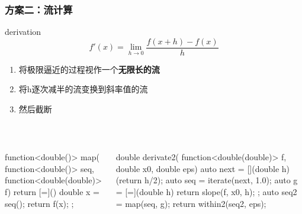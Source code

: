 \documentclass[UTF8,lualatex]{ctexbeamer}
\renewcommand{\emph}[1]{\textbf{#1}}
\begin{document}
\begin{frame}[fragile,t]
    \frametitle{方案二：流计算}
    \footnotesize
    \begin{block}{derivation}
        \[
            f'(x) = \lim_{h\to 0}\frac{f(x+h) - f(x)}{h}
        \]
        \begin{enumerate}
            \item 将极限逼近的过程视作一个\emph{无限长的流}
            \item 将h逐次减半的流变换到斜率值的流
            \item 然后截断
        \end{enumerate}
    \end{block}
    \vspace{-0.5cm}
    \scriptsize
    \begin{columns}[t]
        \begin{column}{.45\textwidth}
            \begin{exampleblock}{~}
                \begin{cppcode}
                    function<double()> map(
                      function<double()> seq,
                      function<double(double)> f) {
                        return [=]() {
                            double x = seq();
                            return f(x);
                        };
                    }
                \end{cppcode}
            \end{exampleblock}
        \end{column}
        \begin{column}{.55\textwidth}
            \begin{exampleblock}{~}
                \begin{cppcode}
                    double derivate2(
                      function<double(double)> f,
                      double x0, double eps) {
                        auto next = [](double h)(return h/2);
                        auto seq = iterate(next, 1.0);
                        auto g = [=](double h) {
                            return slope(f, x0, h);
                        };
                        auto seq2 = map(seq, g);
                        return within2(seq2, eps);
                    }
                \end{cppcode}
            \end{exampleblock}
        \end{column}
    \end{columns}
\end{frame}
\end{document}
